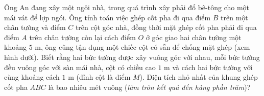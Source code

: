 \begin{ex}%
	Ông An đang xây một ngôi nhà, trong quá trình xây phải đổ bê-tông cho một mái vát để lợp ngói. Ông tính toán việc ghép cốt pha đi qua điểm $B$ trên một chân tường và điểm $C$ trên cột góc nhà, đồng thời mặt ghép cốt pha phải đi qua điểm $A$ trên chân tường còn lại cách điểm $O$ ở góc giao hai chân tường một khoảng $5$ m, ông cũng tận dụng một chiếc cột có sẵn để chống mặt ghép (xem hình dưới). Biết rằng hai bức tường được xây vuông góc với nhau, mỗi bức tường đều vuông góc với sàn mái nhà, cột có chiều cao $1$ m và cách hai bức tường với cùng khoảng cách $1$ m (đỉnh cột là điểm $M$). Diện tích nhỏ nhất của khung ghép cốt pha $ABC$ là bao nhiêu mét vuông (\textit{làm tròn kết quả đến hàng phần trăm})?
	\begin{center}
\end{center}
\end{ex}
